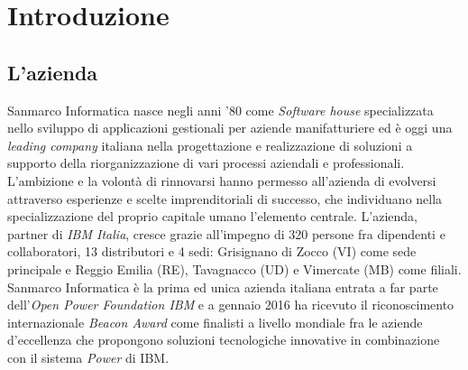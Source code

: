 
\chapter{Introduzione}
\label{cap:introduzione}





\section{L'azienda}

Sanmarco Informatica nasce negli anni '80 come \textit{Software house} specializzata nello sviluppo di applicazioni gestionali per aziende manifatturiere ed è oggi una \textit{leading company} italiana nella progettazione e realizzazione di soluzioni a supporto della riorganizzazione di vari processi aziendali e professionali. L'ambizione e la volontà di rinnovarsi hanno permesso all'azienda di evolversi attraverso esperienze  e scelte imprenditoriali di successo, che individuano nella specializzazione del proprio capitale umano l'elemento centrale. L'azienda, partner di \textit{IBM Italia}, cresce grazie all'impegno di 320 persone fra dipendenti e collaboratori, 13 distributori e 4 sedi: Grisignano di Zocco (VI) come sede principale e Reggio Emilia (RE), Tavagnacco (UD) e Vimercate (MB) come filiali.
Sanmarco Informatica è la prima ed unica azienda italiana entrata a far parte dell'\textit{Open Power Foundation IBM} e a gennaio 2016 ha ricevuto il riconoscimento internazionale \textit{Beacon Award} come finalisti a livello mondiale fra le aziende d'eccellenza che propongono soluzioni tecnologiche innovative in combinazione con il sistema \textit{Power} di IBM.




